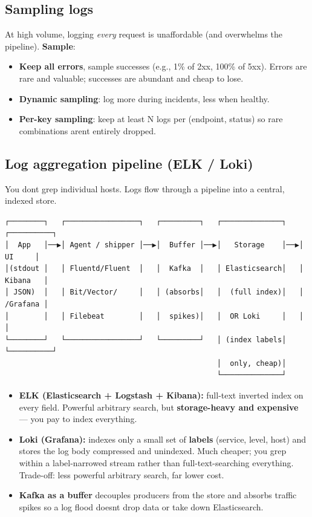 \documentclass[11pt]{article}
\providecommand{\tightlist}{\setlength{\itemsep}{1pt}\setlength{\parskip}{0pt}}
\begin{document}
\subsection{Sampling logs}\label{sampling-logs}

At high volume, logging \emph{every} request is unaffordable (and overwhelms the pipeline). \textbf{Sample}:

\begin{itemize}
\tightlist
\item
  \textbf{Keep all errors}, sample successes (e.g., 1\% of 2xx, 100\% of 5xx). Errors are rare and valuable; successes are abundant and cheap to lose.
\item
  \textbf{Dynamic sampling}: log more during incidents, less when healthy.
\item
  \textbf{Per-key sampling}: keep at least N logs per (endpoint, status) so rare combinations aren\textquotesingle t entirely dropped.
\end{itemize}

\subsection{Log aggregation pipeline (ELK / Loki)}\label{log-aggregation-pipeline-elk--loki}

You don\textquotesingle t grep individual hosts. Logs flow through a pipeline into a central, indexed store.

\setcodelang{}

\begin{verbatim}
┌────────┐   ┌─────────────────┐   ┌─────────┐   ┌──────────────┐   ┌──────────┐
│  App   │──▶│ Agent / shipper │──▶│  Buffer │──▶│   Storage    │──▶│   UI     │
│(stdout │   │ Fluentd/Fluent  │   │  Kafka  │   │ Elasticsearch│   │ Kibana   │
│ JSON)  │   │ Bit/Vector/     │   │ (absorbs│   │  (full index)│   │ /Grafana │
│        │   │ Filebeat        │   │  spikes)│   │  OR Loki     │   │          │
└────────┘   └─────────────────┘   └─────────┘   │ (index labels│   └──────────┘
                                                 │  only, cheap)│
                                                 └──────────────┘
\end{verbatim}

\begin{itemize}
\tightlist
\item
  \textbf{ELK (Elasticsearch + Logstash + Kibana):} full-text inverted index on every field. Powerful arbitrary search, but \textbf{storage-heavy and expensive} --- you pay to index everything.
\item
  \textbf{Loki (Grafana):} indexes only a small set of \textbf{labels} (service, level, host) and stores the log body compressed and unindexed. Much cheaper; you grep within a label-narrowed stream rather than full-text-searching everything. Trade-off: less powerful arbitrary search, far lower cost.
\item
  \textbf{Kafka as a buffer} decouples producers from the store and absorbs traffic spikes so a log flood doesn\textquotesingle t drop data or take down Elasticsearch.
\end{itemize}
\end{document}
